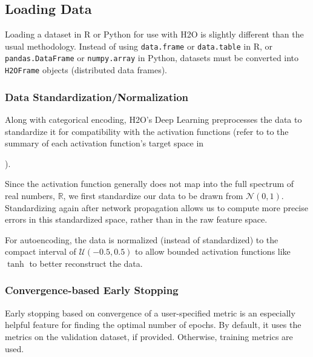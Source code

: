 \subsection{Loading Data} 

Loading a dataset in R or Python for use with H2O is slightly different than the usual methodology.  Instead of using \texttt{data.frame} or \texttt{data.table} in R, or \texttt{pandas.DataFrame} or \texttt{numpy.array} in Python, datasets must be converted into \texttt{H2OFrame} objects (distributed data frames). 

\subsubsection{Data Standardization/Normalization} 

Along with categorical encoding, H2O's Deep Learning preprocesses the data to standardize it for compatibility with the activation functions (refer to to the summary of each activation function's target space in {\textbf{}). 

Since the activation function generally does not  map into the full spectrum of real numbers, $\mathbb{R}$, we first standardize our data to be drawn from $\mathcal{N}(0,1)$. Standardizing again after network propagation allows us to compute more precise errors in this standardized space, rather than in the raw feature space. 

For autoencoding, the data is normalized (instead of standardized) to the compact interval of $\mathcal{U}(-0.5,0.5)$ to allow bounded activation functions like $\tanh$ to better reconstruct the data.

\subsubsection{Convergence-based Early Stopping}

Early stopping based on convergence of a user-specified metric is an especially helpful feature for finding the optimal number of epochs. By default, it uses the metrics on the validation dataset, if provided. Otherwise, training metrics are used.

}
